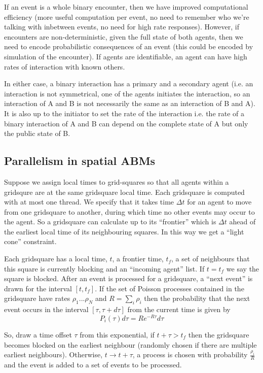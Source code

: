 \documentclass[a4paper]{article}
\begin{document}
If an event is a whole binary encounter, then we have improved computational efficiency (more useful computation per event, no need to remember who we're talking with inbetween events, no need for high rate responses). However, if encounters are non-deterministic, given the full state of both agents, then we need to encode probabilistic consequences of an event (this could be encoded by simulation of the encounter). If agents are identifiable, an agent can have high rates of interaction with known others.

In either case, a binary interaction has a primary and a secondary agent (i.e. an interaction is not symmetrical, one of the agents initiates the interaction, so an interaction of A and B is not necessarily the same as an interaction of B and A). It is also up to the initiator to set the rate of the interaction i.e. the rate of a binary interaction of A and B can depend on the complete state of A but only the public state of B.

\subsection{Parallelism in spatial ABMs}

Suppose we assign local times to grid-squares so that all agents within a gridsqure are at the same gridsquare local time. Each gridsquare is computed with at most one thread. We specify that it takes time $\Delta t$ for an agent to move from one gridsquare to another, during which time no other events may occur to the agent. So a gridsquare can calculate up to its ``frontier'' which is $\Delta t$ ahead of the earliest local time of its neighbouring squares. In this way we get a ``light cone'' constraint.

Each gridsquare has a local time, $t$, a frontier time, $t_f$, a set of neighbours that this square is currently blocking and an ``incoming agent'' list. If $t=t_f$ we say the square is blocked. After an event is processed for a gridsquare, a ``next event'' is drawn for the interval $[t,t_f]$. If the set of Poisson processes contained in the gridsquare have rates $\rho_1...\rho_N$ and $R = \sum_i \rho_i$ then the probability that the next event occurs in the interval $[\tau, \tau+d\tau]$ from the current time is given by
\[
P_i(\tau)d\tau = Re^{-R\tau}d\tau
\]

So, draw a time offset $\tau$ from this exponential, if $t + \tau > t_f$ then the gridsquare becomes blocked on the earliest neighbour (randomly chosen if there are multiple earliest neighbours). Otherwise, $t \to t + \tau$, a process is chosen with probability $\frac{\rho_i}{R}$ and the event is added to a set of events to be processed.
\end{document}
